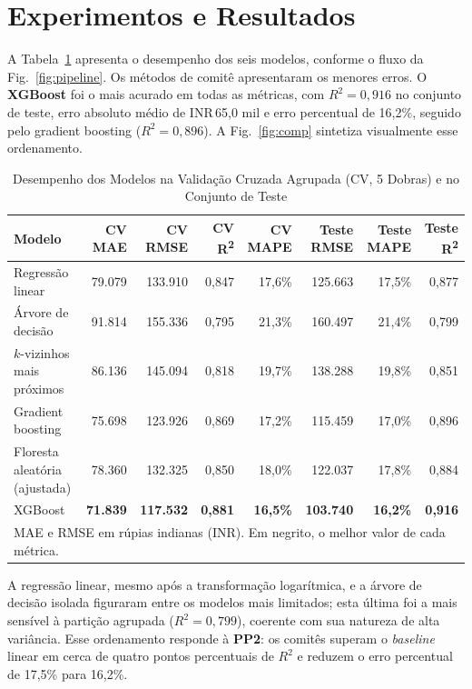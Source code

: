 \documentclass[conference]{IEEEtran}
\begin{document}
\section{Experimentos e Resultados}

A Tabela~\ref{tab:resultados} apresenta o desempenho dos seis modelos, conforme o fluxo da Fig.~\ref{fig:pipeline}. Os métodos de comitê apresentaram os menores erros. O \textbf{XGBoost} foi o mais acurado em todas as métricas, com $R^{2}=0{,}916$ no conjunto de teste, erro absoluto médio de INR\,65,0 mil e erro percentual de 16,2\%, seguido pelo gradient boosting ($R^{2}=0{,}896$). A Fig.~\ref{fig:comp} sintetiza visualmente esse ordenamento.

\begin{table}[t]
\caption{Desempenho dos Modelos na Validação Cruzada Agrupada (CV, 5 Dobras) e no Conjunto de Teste}
\begin{center}
\begin{tabular}{lrrrrrrr}
\toprule
\textbf{Modelo} & \textbf{CV MAE} & \textbf{CV RMSE} & \textbf{CV R\textsuperscript{2}} & \textbf{CV MAPE} & \textbf{Teste RMSE} & \textbf{Teste MAPE} & \textbf{Teste R\textsuperscript{2}} \\
\midrule
Regressão linear      & 79.079 & 133.910 & 0,847 & 17,6\% & 125.663 & 17,5\% & 0,877 \\
Árvore de decisão     & 91.814 & 155.336 & 0,795 & 21,3\% & 160.497 & 21,4\% & 0,799 \\
$k$-vizinhos mais próximos & 86.136 & 145.094 & 0,818 & 19,7\% & 138.288 & 19,8\% & 0,851 \\
Gradient boosting     & 75.698 & 123.926 & 0,869 & 17,2\% & 115.459 & 17,0\% & 0,896 \\
Floresta aleatória (ajustada) & 78.360 & 132.325 & 0,850 & 18,0\% & 122.037 & 17,8\% & 0,884 \\
XGBoost               & \textbf{71.839} & \textbf{117.532} & \textbf{0,881} & \textbf{16,5\%} & \textbf{103.740} & \textbf{16,2\%} & \textbf{0,916} \\
\bottomrule
\multicolumn{8}{l}{\footnotesize MAE e RMSE em rúpias indianas (INR). Em negrito, o melhor valor de cada métrica.}
\end{tabular}
\label{tab:resultados}
\end{center}
\end{table}

A regressão linear, mesmo após a transformação logarítmica, e a árvore de decisão isolada figuraram entre os modelos mais limitados; esta última foi a mais sensível à partição agrupada ($R^{2}=0{,}799$), coerente com sua natureza de alta variância. Esse ordenamento responde à \textbf{PP2}: os comitês superam o \textit{baseline} linear em cerca de quatro pontos percentuais de $R^{2}$ e reduzem o erro percentual de 17,5\% para 16,2\%.
\end{document}
